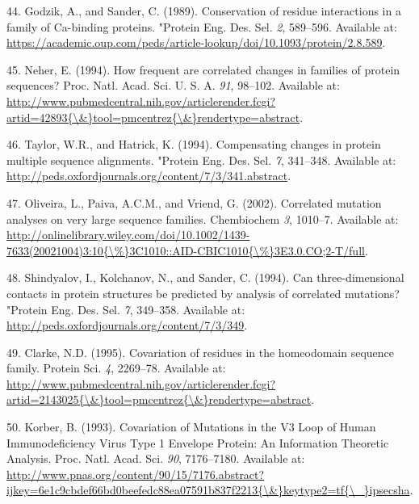 \documentclass[11pt,a4paper,twoside]{book}
\theoremstyle{definition}
\theoremstyle{definition}
\theoremstyle{remark}
\begin{document}
\hypertarget{ref-Godzik1989}{}
44. Godzik, A., and Sander, C. (1989). Conservation of residue
interactions in a family of Ca-binding proteins. "Protein Eng. Des. Sel.
\emph{2}, 589--596. Available at:
\url{https://academic.oup.com/peds/article-lookup/doi/10.1093/protein/2.8.589}.

\hypertarget{ref-Neher1994}{}
45. Neher, E. (1994). How frequent are correlated changes in families of
protein sequences? Proc. Natl. Acad. Sci. U. S. A. \emph{91}, 98--102.
Available at:
\href{http://www.pubmedcentral.nih.gov/articlerender.fcgi?artid=42893\%7B/\&\%7Dtool=pmcentrez\%7B/\&\%7Drendertype=abstract}{http://www.pubmedcentral.nih.gov/articlerender.fcgi?artid=42893\{\textbackslash{}\&\}tool=pmcentrez\{\textbackslash{}\&\}rendertype=abstract}.

\hypertarget{ref-Taylor1994}{}
46. Taylor, W.R., and Hatrick, K. (1994). Compensating changes in
protein multiple sequence alignments. "Protein Eng. Des. Sel. \emph{7},
341--348. Available at:
\url{http://peds.oxfordjournals.org/content/7/3/341.abstract}.

\hypertarget{ref-Oliveira2002}{}
47. Oliveira, L., Paiva, A.C.M., and Vriend, G. (2002). Correlated
mutation analyses on very large sequence families. Chembiochem \emph{3},
1010--7. Available at:
\href{http://onlinelibrary.wiley.com/doi/10.1002/1439-7633(20021004)3:10\%7B/\%\%7D3C1010::AID-CBIC1010\%7B/\%\%7D3E3.0.CO;2-T/full}{http://onlinelibrary.wiley.com/doi/10.1002/1439-7633(20021004)3:10\{\textbackslash{}\%\}3C1010::AID-CBIC1010\{\textbackslash{}\%\}3E3.0.CO;2-T/full}.

\hypertarget{ref-Shindyalov1994}{}
48. Shindyalov, I., Kolchanov, N., and Sander, C. (1994). Can
three-dimensional contacts in protein structures be predicted by
analysis of correlated mutations? "Protein Eng. Des. Sel. \emph{7},
349--358. Available at:
\url{http://peds.oxfordjournals.org/content/7/3/349}.

\hypertarget{ref-Clarke1995}{}
49. Clarke, N.D. (1995). Covariation of residues in the homeodomain
sequence family. Protein Sci. \emph{4}, 2269--78. Available at:
\href{http://www.pubmedcentral.nih.gov/articlerender.fcgi?artid=2143025\%7B/\&\%7Dtool=pmcentrez\%7B/\&\%7Drendertype=abstract}{http://www.pubmedcentral.nih.gov/articlerender.fcgi?artid=2143025\{\textbackslash{}\&\}tool=pmcentrez\{\textbackslash{}\&\}rendertype=abstract}.

\hypertarget{ref-Korber1993}{}
50. Korber, B. (1993). Covariation of Mutations in the V3 Loop of Human
Immunodeficiency Virus Type 1 Envelope Protein: An Information Theoretic
Analysis. Proc. Natl. Acad. Sci. \emph{90}, 7176--7180. Available at:
\href{http://www.pnas.org/content/90/15/7176.abstract?ijkey=6e1c9cbdef66bd0beefedc88ea07591b837f2213\%7B/\&\%7Dkeytype2=tf\%7B/_\%7Dipsecsha}{http://www.pnas.org/content/90/15/7176.abstract?ijkey=6e1c9cbdef66bd0beefedc88ea07591b837f2213\{\textbackslash{}\&\}keytype2=tf\{\textbackslash{}\_\}ipsecsha}.
\end{document}
